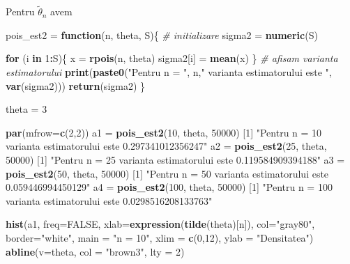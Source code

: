 \documentclass[]{article}
\newenvironment{Shaded}{\begin{snugshade}}{\end{snugshade}}
\newcommand{\KeywordTok}[1]{\textcolor[rgb]{0.13,0.29,0.53}{\textbf{#1}}}
\newcommand{\DataTypeTok}[1]{\textcolor[rgb]{0.13,0.29,0.53}{#1}}
\newcommand{\DecValTok}[1]{\textcolor[rgb]{0.00,0.00,0.81}{#1}}
\newcommand{\StringTok}[1]{\textcolor[rgb]{0.31,0.60,0.02}{#1}}
\newcommand{\CommentTok}[1]{\textcolor[rgb]{0.56,0.35,0.01}{\textit{#1}}}
\newcommand{\OtherTok}[1]{\textcolor[rgb]{0.56,0.35,0.01}{#1}}
\newcommand{\ControlFlowTok}[1]{\textcolor[rgb]{0.13,0.29,0.53}{\textbf{#1}}}
\newcommand{\OperatorTok}[1]{\textcolor[rgb]{0.81,0.36,0.00}{\textbf{#1}}}
\newcommand{\NormalTok}[1]{#1}
\begin{document}
Pentru \(\tilde{\theta}_n\) avem

\begin{Shaded}
\begin{Highlighting}[]
\NormalTok{pois_est2 =}\StringTok{ }\ControlFlowTok{function}\NormalTok{(n, theta, S)\{}
  \CommentTok{# initializare}
\NormalTok{  sigma2 =}\StringTok{ }\KeywordTok{numeric}\NormalTok{(S)}
  
  \ControlFlowTok{for}\NormalTok{ (i }\ControlFlowTok{in} \DecValTok{1}\OperatorTok{:}\NormalTok{S)\{}
\NormalTok{    x =}\StringTok{ }\KeywordTok{rpois}\NormalTok{(n, theta)}
\NormalTok{    sigma2[i] =}\StringTok{ }\KeywordTok{mean}\NormalTok{(x)}
\NormalTok{  \}}
  \CommentTok{# afisam varianta estimatorului}
  \KeywordTok{print}\NormalTok{(}\KeywordTok{paste0}\NormalTok{(}\StringTok{"Pentru n = "}\NormalTok{, n,}\StringTok{" varianta estimatorului este "}\NormalTok{, }\KeywordTok{var}\NormalTok{(sigma2)))}
  \KeywordTok{return}\NormalTok{(sigma2)}
\NormalTok{\}}

\NormalTok{theta =}\StringTok{ }\DecValTok{3}

\KeywordTok{par}\NormalTok{(}\DataTypeTok{mfrow=}\KeywordTok{c}\NormalTok{(}\DecValTok{2}\NormalTok{,}\DecValTok{2}\NormalTok{))}
\NormalTok{a1 =}\StringTok{ }\KeywordTok{pois_est2}\NormalTok{(}\DecValTok{10}\NormalTok{, theta, }\DecValTok{50000}\NormalTok{)}
\NormalTok{[}\DecValTok{1}\NormalTok{] }\StringTok{"Pentru n = 10 varianta estimatorului este 0.297341012356247"}
\NormalTok{a2 =}\StringTok{ }\KeywordTok{pois_est2}\NormalTok{(}\DecValTok{25}\NormalTok{, theta, }\DecValTok{50000}\NormalTok{)}
\NormalTok{[}\DecValTok{1}\NormalTok{] }\StringTok{"Pentru n = 25 varianta estimatorului este 0.119584909394188"}
\NormalTok{a3 =}\StringTok{ }\KeywordTok{pois_est2}\NormalTok{(}\DecValTok{50}\NormalTok{, theta, }\DecValTok{50000}\NormalTok{)}
\NormalTok{[}\DecValTok{1}\NormalTok{] }\StringTok{"Pentru n = 50 varianta estimatorului este 0.059446994450129"}
\NormalTok{a4 =}\StringTok{ }\KeywordTok{pois_est2}\NormalTok{(}\DecValTok{100}\NormalTok{, theta, }\DecValTok{50000}\NormalTok{)}
\NormalTok{[}\DecValTok{1}\NormalTok{] }\StringTok{"Pentru n = 100 varianta estimatorului este 0.0298516208133763"}


\KeywordTok{hist}\NormalTok{(a1, }\DataTypeTok{freq=}\OtherTok{FALSE}\NormalTok{, }\DataTypeTok{xlab=}\KeywordTok{expression}\NormalTok{(}\KeywordTok{tilde}\NormalTok{(theta)[n]), }
     \DataTypeTok{col=}\StringTok{"gray80"}\NormalTok{, }\DataTypeTok{border=}\StringTok{"white"}\NormalTok{, }\DataTypeTok{main =} \StringTok{"n = 10"}\NormalTok{, }\DataTypeTok{xlim =} \KeywordTok{c}\NormalTok{(}\DecValTok{0}\NormalTok{,}\DecValTok{12}\NormalTok{),}
     \DataTypeTok{ylab =} \StringTok{"Densitatea"}\NormalTok{)}
\KeywordTok{abline}\NormalTok{(}\DataTypeTok{v=}\NormalTok{theta, }\DataTypeTok{col =} \StringTok{"brown3"}\NormalTok{, }\DataTypeTok{lty =} \DecValTok{2}\NormalTok{)}


\end{Highlighting}
\end{Shaded}
\end{document}
